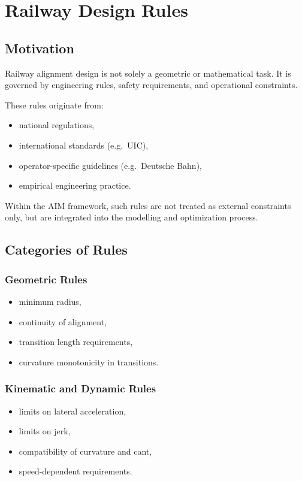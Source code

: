\chapter{Railway Design Rules}

\section*{Motivation}

Railway alignment design is not solely a geometric or mathematical task.
It is governed by engineering rules, safety requirements, and operational
constraints.

These rules originate from:
\begin{itemize}
\item national regulations,
\item international standards (e.g.\ UIC),
\item operator-specific guidelines (e.g.\ Deutsche Bahn),
\item empirical engineering practice.
\end{itemize}

Within the AIM framework, such rules are not treated as external
constraints only, but are integrated into the modelling and optimization
process.


\section{Categories of Rules}

\subsection{Geometric Rules}

\begin{itemize}
\item minimum radius,
\item continuity of alignment,
\item transition length requirements,
\item curvature monotonicity in transitions.
\end{itemize}

\subsection{Kinematic and Dynamic Rules}

\begin{itemize}
\item limits on lateral acceleration,
\item limits on jerk,
\item compatibility of curvature and cant,
\item speed-dependent requirements.
\end{itemize}


